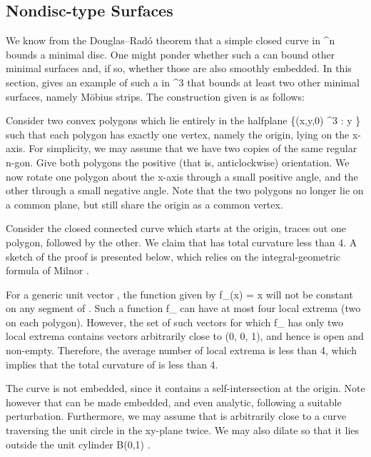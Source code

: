 \documentclass[a4paper, 11pt]{article}
\theoremstyle{plain}
\theoremstyle{definition}
\theoremstyle{remark}
\numberwithin{equation}{subsection}
\def\({}
\def\){}
\def\pi{}
\begin{document}
\subsection{Nondisc-type Surfaces}
\label{section: Nondisc-type Surfaces}

We know from the Douglas--Rad{\'o} theorem that a simple closed curve \(\Gamma\) in \(^{n}\) bounds a minimal disc. One might ponder whether such a \(\Gamma\) can bound other minimal surfaces and, if so, whether those are also smoothly embedded. In this section, \cite{EWW02} gives an example of such a \(\Gamma\) in \(^{3}\) that bounds at least two other minimal surfaces, namely M{\"o}bius strips. The construction given is as follows:

Consider two convex polygons which lie entirely in the halfplane \(\{(x,y,0) \in {}^{3} : y \}\) such that each polygon has exactly one vertex, namely the origin, lying on the \(x\)-axis. For simplicity, we may assume that we have two copies of the same regular \(n\)-gon. Give both polygons the positive (that is, anticlockwise) orientation. We now rotate one polygon about the \(x\)-axis through a small positive angle, and the other through a small negative angle. Note that the two polygons no longer lie on a common plane, but still share the origin as a common vertex.

Consider the closed connected curve \(\Gamma\) which starts at the origin, traces out one polygon, followed by the other. We claim that \(\Gamma\) has total curvature less than \(4\pi\). A sketch of the proof is presented below, which relies on the integral-geometric formula of Milnor \cite[Theorem 3.1]{Mil50}.

For a generic unit vector \(\), the function given by \(f_{}(x) =  \cdot x\) will not be constant on any segment of \(\Gamma\). Such a function \(f_{}\) can have at most four local extrema (two on each polygon). However, the set of such vectors \(\) for which \(f_{}\) has only two local extrema contains vectors arbitrarily close to \((0, 0, 1)\), and hence is open and non-empty. Therefore, the average number of local extrema is less than 4, which implies that the total curvature of \(\Gamma\) is less than \(4\pi\).

The curve \(\Gamma\) is not embedded, since it contains a self-intersection at the origin. Note however that \(\Gamma\) can be made embedded, and even analytic, following a suitable perturbation. Furthermore, we may assume that \(\Gamma\) is arbitrarily close to a curve traversing the unit circle in the \(xy\)-plane twice. We may also dilate \(\Gamma\) so that it lies outside the unit cylinder \(B(0,1) \times {}\).
\end{document}
